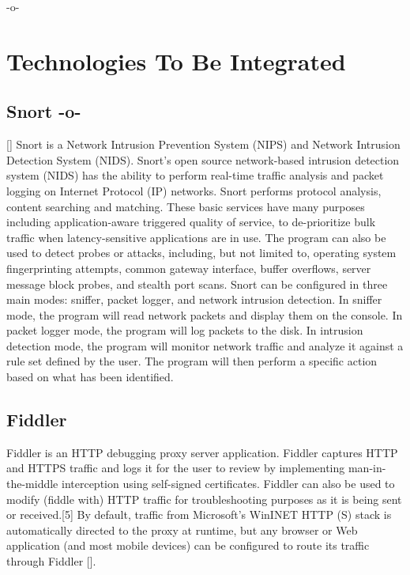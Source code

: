      -o-


\section{Technologies To Be Integrated}
\label{S:o-todo}

\subsection{Snort -o-}
 [\cite{www-snort}] Snort is a Network Intrusion Prevention System
(NIPS) and Network Intrusion Detection System (NIDS). Snort's open
source network-based intrusion detection system (NIDS) has the ability
to perform real-time traffic analysis and packet logging on Internet
Protocol (IP) networks. Snort performs protocol analysis, content
searching and matching. These basic services have many purposes
including application-aware triggered quality of service, to
de-prioritize bulk traffic when latency-sensitive applications are in
use.  The program can also be used to detect probes or attacks,
including, but not limited to, operating system fingerprinting
attempts, common gateway interface, buffer overflows, server message
block probes, and stealth port scans.  Snort can be configured in
three main modes: sniffer, packet logger, and network intrusion
detection. In sniffer mode, the program will read network packets and
display them on the console. In packet logger mode, the program will
log packets to the disk. In intrusion detection mode, the program will
monitor network traffic and analyze it against a rule set defined by
the user. The program will then perform a specific action based on
what has been identified.

\subsection{Fiddler}

Fiddler is an HTTP debugging proxy server application. Fiddler
captures HTTP and HTTPS traffic and logs it for the user to review by
implementing man-in-the-middle interception using self-signed
certificates. Fiddler can also be used to modify (fiddle with) HTTP
traffic for troubleshooting purposes as it is being sent or
received.[5] By default, traffic from Microsoft's WinINET HTTP (S)
stack is automatically directed to the proxy at runtime, but any
browser or Web application (and most mobile devices) can be configured
to route its traffic through Fiddler [\cite{www-fiddler}].

